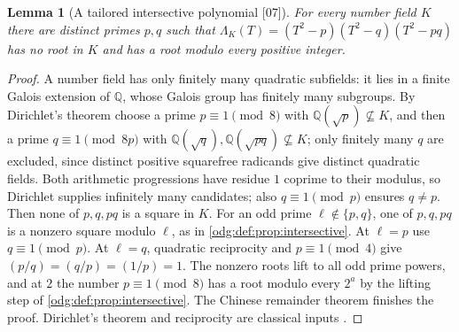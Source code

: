 \documentclass[11pt,oneside]{article}
\numberwithin{equation}{section}
\newtheorem{lemma}[lemma]{Lemma}
\theoremstyle{definition}
\theoremstyle{remark}
\newcommand{\Q}{\mathbb Q}
\newcommand{\src}[1]{\textup{\textsf{\small[#1]}}}
\begin{document}
\begin{lemma}[A tailored intersective polynomial \src{07}]\label{odg:def:lem:tailored}
For every number field $K$ there are distinct primes $p,q$ such that
$\Lambda_K(T)=(T^2-p)(T^2-q)(T^2-pq)$ has no root in $K$ and has a root modulo
every positive integer.
\end{lemma}
\begin{proof}
A number field has only finitely many quadratic subfields: it lies in a finite
Galois extension of $\Q$, whose Galois group has finitely many subgroups. By
Dirichlet's theorem choose a prime $p\equiv1\pmod8$ with
$\Q(\sqrt p)\not\subseteq K$, and then a prime $q\equiv1\pmod{8p}$ with
$\Q(\sqrt q),\Q(\sqrt{pq})\not\subseteq K$; only finitely many $q$ are
excluded, since distinct positive squarefree radicands give distinct
quadratic fields. Both arithmetic progressions have residue $1$ coprime
to their modulus, so Dirichlet supplies infinitely many candidates; also
$q\equiv1\pmod p$ ensures $q\ne p$. Then none of $p,q,pq$ is a square in $K$. For an odd prime
$\ell\notin\{p,q\}$, one of $p,q,pq$ is a nonzero square modulo $\ell$, as in
\cref{odg:def:prop:intersective}. At $\ell=p$ use $q\equiv1\pmod p$. At
$\ell=q$, quadratic reciprocity and $p\equiv1\pmod4$ give
$(p/q)=(q/p)=(1/p)=1$. The nonzero roots lift to all odd prime powers, and at
$2$ the number $p\equiv1\pmod8$ has a root modulo every $2^a$ by the lifting
step of \cref{odg:def:prop:intersective}. The Chinese remainder theorem
finishes the proof. Dirichlet's theorem and reciprocity are classical inputs
\cite{Apostol}.
\end{proof}
\end{document}
